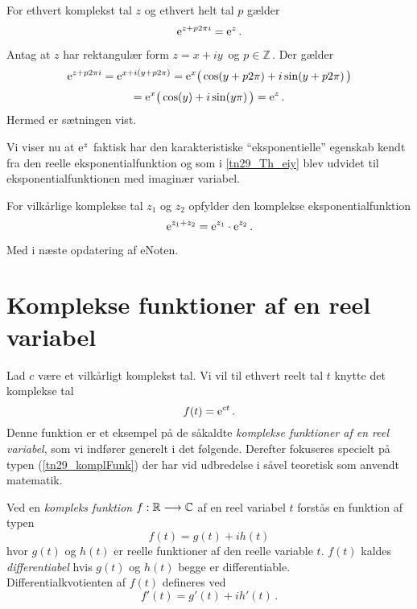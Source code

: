 \begin{theorem}[Periodicitet af $\e^z$]
For ethvert komplekst tal $z$ og ethvert helt tal $p$ gælder
\begin{equation}
\mathrm{e}^{z+p2\pi i}=\mathrm{e}^z\,.
\end{equation}
\end{theorem}
\begin{bevis}
Antag at $z$ har rektangulær form $z=x+iy\,$ og $p\in \mathbb Z\,.$\bs
Der gælder
$$
\mathrm{e}^{z+p2\pi i}
=\mathrm{e}^{x+i(y+p2\pi)}
=\mathrm{e}^x\big(\cos(y+p2\pi)+i\sin(y+p2\pi)\,\big)$$
$$=\mathrm{e}^x\big(\cos(y)+i\sin(y\pi)\,\big)
=\mathrm{e}^z\,.$$
Hermed er sætningen vist.
\end{bevis}
Vi viser nu at $\e^z$ faktisk har den karakteristiske ``eksponentielle'' egenskab kendt fra den reelle eksponentialfunktion og som i \ref{tn29_Th_eiy} blev udvidet til eksponentialfunktionen med imaginær variabel.\bs 
\begin{theorem}\label{tn29_Th_ez}
For vilkårlige komplekse tal $z_1$ og $z_2$ opfylder den komplekse eksponentialfunktion
\begin{equation}
\mathrm{e}^{z_1+z_2}=\mathrm{e}^{z_1}\cdot\mathrm{e}^{z_2}\,.
\end{equation}
\end{theorem}
\begin{bevis}
Med i næste opdatering af eNoten.
\end{bevis}

\section{Komplekse funktioner af en reel variabel}

Lad $c$ være et vilkårligt komplekst tal. Vi vil til ethvert reelt tal $t$ knytte det komplekse tal
\begin{equation}\label{tn29_komplFunk}
f(t)=\mathrm{e}^{ct}\,.
\end{equation}
Denne funktion er et eksempel på de såkaldte \textit{komplekse funktioner af en reel variabel}, som vi indfører generelt i det følgende. Derefter  fokuseres specielt på typen (\ref{tn29_komplFunk}) der har vid udbredelse i såvel teoretisk som anvendt matematik. \bs

\begin{definition}
Ved en \textit{kompleks funktion} $f:\mathbb{R}\longrightarrow \mathbb C$
af en reel variabel $t$ forstås en funktion af typen
\begin{equation}
f(t)=g(t)+ih(t)
\end{equation}
hvor $g(t)$ og $h(t)$ er reelle funktioner af den reelle variable $t$.\bs
$f(t)$ kaldes \textit{differentiabel} hvis $g(t)$ og $h(t)$ begge er differentiable.\\
Differentialkvotienten af $f(t)$ defineres ved
\begin{equation}
f'(t)=g'(t)+ih'(t)\,.
\end{equation}
\end{definition}

